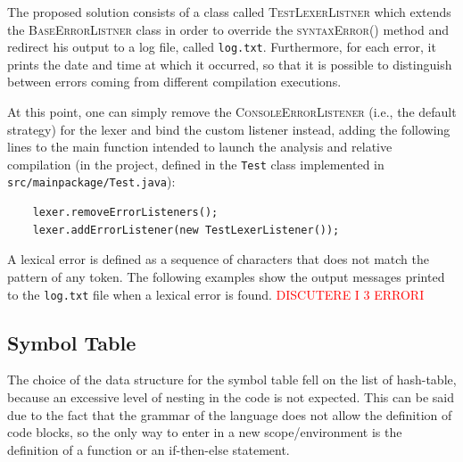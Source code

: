 \documentclass[11pt]{article} %
\newcommand{\ES}{\textcolor{red}}
\begin{document}
\medskip

The proposed solution consists of a class called \textsc{TestLexerListner} which extends the \textsc{BaseErrorListner} class in order to override the \textsc{syntaxError()} method and redirect his output to a log file, called \verb|log.txt|. Furthermore, for each error, it prints the date and time at which it occurred, so that it is possible to distinguish between errors coming from different compilation executions. 

\medskip

At this point, one can simply remove the \textsc{ConsoleErrorListener} (i.e., the default strategy) for the lexer and bind the custom listener instead, adding the following lines to the main function intended to launch the analysis and relative compilation (in the project, defined in the \verb|Test| class implemented in \verb|src/mainpackage/Test.java|):
\begin{lstlisting}
    lexer.removeErrorListeners();
    lexer.addErrorListener(new TestLexerListener());
\end{lstlisting}

A lexical error is defined as a sequence of characters that does not match the pattern of any token. The following examples show the output messages printed to the \verb|log.txt| file when a lexical error is found.
\ES{DISCUTERE I 3 ERRORI}
%


\subsection{Symbol Table}
The choice of the data structure for the symbol table fell on the list of hash-table, because an excessive level of nesting in the code is not expected. This can be said due to the fact that the grammar of the language does not allow the definition of code blocks, so the only way to enter in a new scope/environment is the definition of a function or an if-then-else statement. 

\medskip
\end{document}
